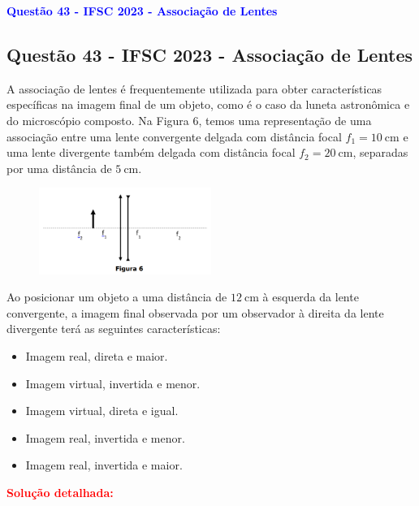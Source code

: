 \begin{flushleft}
\textbf{\textcolor{blue}{\Large Quest\~ao 43 - IFSC 2023 - Associação de Lentes}}\\
\noindent

\subsection{Quest\~ao 43 - IFSC 2023 - Associação de Lentes}
A associa\c{c}\~ao de lentes \'e frequentemente utilizada para obter caracter\'isticas espec\'ificas na imagem final de um objeto, como \'e o caso da luneta 
astron\^omica e do microsc\'opio composto. Na Figura 6, temos uma representa\c{c}\~ao de uma associa\c{c}\~ao entre uma lente convergente delgada com 
dist\^ancia focal $f_1=10\ \mathrm{cm}$ e uma lente divergente tamb\'em delgada com dist\^ancia focal $f_2=20\ \mathrm{cm}$, separadas por uma dist\^ancia 
de $5\ \mathrm{cm}$.

\begin{figure}
    \centering
    \includegraphics[width=0.5\textwidth]{figures/associacao-de-lentes.png}
\end{figure}

Ao posicionar um objeto a uma dist\^ancia de $12\ \mathrm{cm}$ \`a esquerda da lente convergente, a imagem final observada por um observador \`a direita da lente divergente ter\'a as seguintes caracter\'isticas:

\begin{itemize}
  \item[(A)] Imagem real, direta e maior.
  \item[(B)] Imagem virtual, invertida e menor.
  \item[(C)] Imagem virtual, direta e igual.
  \item[(D)] Imagem real, invertida e menor.
  \item[(E)] Imagem real, invertida e maior.
\end{itemize}

\vspace{0.5cm}

\textcolor{red}{\textbf{Solu\c{c}\~ao detalhada:}}\\


\end{flushleft}
